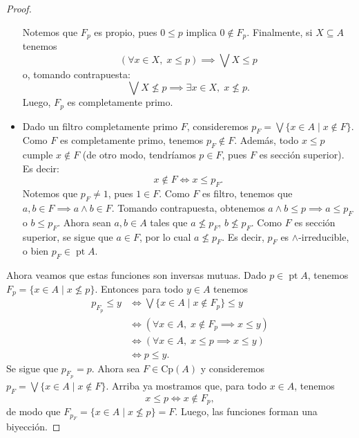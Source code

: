 \documentclass[12pt,letterpaper,titlepage]{article}
\theoremstyle{definition}
\newcommand\Sup{\bigvee}
\renewcommand\inf{\wedge}
\newcommand\<{\langle}
\renewcommand\>{\rangle}
\newcommand{\Cp}{\mathrm{Cp}}
\DeclareMathOperator{\pt}{pt}
\begin{document}
\begin{proof}
\begin{itemize}
        Notemos que $F_p$ es propio, pues $0\leq p$
        implica $0\nin F_p$.
        Finalmente, si $X\subseteq A$ tenemos
        \[
            (\forall x\in X,\; x\leq p)\implies\Sup X\leq p
        \]
        o, tomando contrapuesta:
        \[
            \Sup X\nleq p \implies \exists x\in X,\; x\nleq p
        .\]
        Luego, $F_p$ es completamente primo.
        \item
        Dado un filtro completamente primo $F$,
        consideremos $p_F=\Sup\{x\in A\mid x\nin F\}$.
        Como $F$ es completamente primo, tenemos $p_F\nin F$.
        Además, todo $x\leq p$ cumple $x\nin F$
        (de otro modo, tendríamos $p\in F$,
        pues $F$ es sección superior).
        Es decir:
        \[
            x\nin F\iff x\leq p_F
        .\]
        Notemos que $p_F\neq 1$, pues $1\in F$.
        Como $F$ es filtro, tenemos que
        $a,b\in F\implies a\inf b\in F$.
        Tomando contrapuesta, obtenemos
        $a\inf b\leq p\implies a\leq p_F$ o $b\leq p_F$.
        Ahora sean $a,b\in A$ tales que $a\nleq p_F$, $b\nleq p_F$.
        Como $F$ es sección superior, se sigue que $a\in F$,
        por lo cual $a\nleq p_F$.
        Es decir, $p_F$ es $\inf$-irreducible,
        o bien $p_F\in\pt A$.
    \end{itemize}
    Ahora veamos que estas funciones son inversas mutuas.
    Dado $p\in\pt A$, tenemos $F_p=\{x\in A\mid x\nleq p\}$.
    Entonces para todo $y\in A$ tenemos
    \begin{align*}
        p_{F_p} \leq y
        &\iff \Sup\{x\in A\mid x\nin F_p\}\leq y \\
        &\iff (\forall x\in A,\; x\nin F_p\implies x\leq y) \\
        &\iff (\forall x\in A,\; x\leq p\implies x\leq y) \\
        &\iff p\leq y.
    \end{align*}
    Se sigue que $p_{F_p}=p$.
    Ahora sea $F\in\Cp(A)$ y consideremos
    $p_F=\Sup\{x\in A\mid x\nin F\}$.
    Arriba ya mostramos que, para todo $x\in A$, tenemos
    \[
        x\leq p \iff x\nin F_p
    ,\]
    de modo que $F_{p_F}=\{x\in A\mid x\nleq p\}=F$.
    Luego, las funciones forman una biyección.
    

\end{proof}
\end{document}
